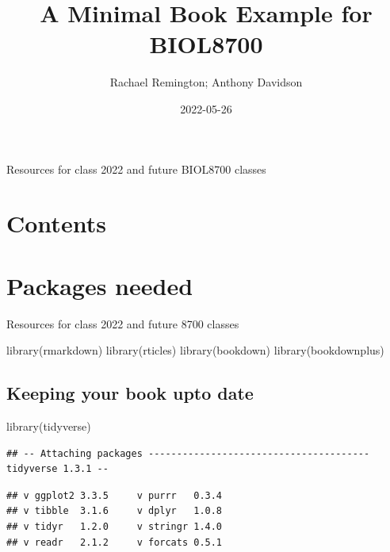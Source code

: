 \documentclass[
]{book}
\title{A Minimal Book Example for BIOL8700}
\author{Rachael Remington; Anthony Davidson}
\date{2022-05-26}
\newenvironment{Shaded}{\begin{snugshade}}{\end{snugshade}}
\newcommand{\FunctionTok}[1]{\textcolor[rgb]{0.00,0.00,0.00}{#1}}
\newcommand{\NormalTok}[1]{#1}
\begin{document}
\maketitle

{
\setcounter{tocdepth}{1}
\tableofcontents
}
Resources for class 2022 and future BIOL8700 classes

\hypertarget{contents}{%
\chapter{Contents}\label{contents}}

\hypertarget{packages-needed}{%
\chapter{Packages needed}\label{packages-needed}}

Resources for class 2022 and future 8700 classes

\begin{Shaded}
\begin{Highlighting}[]
\FunctionTok{library}\NormalTok{(rmarkdown)}
\FunctionTok{library}\NormalTok{(rticles)}
\FunctionTok{library}\NormalTok{(bookdown)}
\FunctionTok{library}\NormalTok{(bookdownplus)}
\end{Highlighting}
\end{Shaded}

\hypertarget{keeping-your-book-upto-date}{%
\section{Keeping your book upto date}\label{keeping-your-book-upto-date}}

\begin{Shaded}
\begin{Highlighting}[]
\FunctionTok{library}\NormalTok{(tidyverse)}
\end{Highlighting}
\end{Shaded}

\begin{verbatim}
## -- Attaching packages --------------------------------------- tidyverse 1.3.1 --
\end{verbatim}

\begin{verbatim}
## v ggplot2 3.3.5     v purrr   0.3.4
## v tibble  3.1.6     v dplyr   1.0.8
## v tidyr   1.2.0     v stringr 1.4.0
## v readr   2.1.2     v forcats 0.5.1
\end{verbatim}
\end{document}
